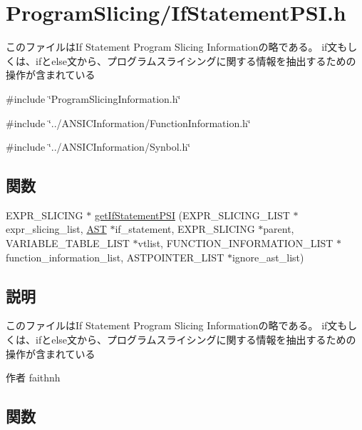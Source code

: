 \section{ProgramSlicing/IfStatementPSI.h}
\label{IfStatementPSI_8h}


このファイルはIf Statement Program Slicing Informationの略である。 if文もしくは、ifとelse文から、プログラムスライシングに関する情報を抽出するための操作が含まれている  


{\ttfamily \#include \char`\"{}ProgramSlicingInformation.h\char`\"{}}\par
{\ttfamily \#include \char`\"{}../ANSICInformation/FunctionInformation.h\char`\"{}}\par
{\ttfamily \#include \char`\"{}../ANSICInformation/Synbol.h\char`\"{}}\par
\subsection*{関数}
\begin{DoxyCompactItemize}
\item 
EXPR\_\-SLICING $\ast$ \hyperlink{IfStatementPSI_8h_a4044e731b04632e5f98eed34d6afb041}{getIfStatementPSI} (EXPR\_\-SLICING\_\-LIST $\ast$expr\_\-slicing\_\-list, \hyperlink{structabstract__syntax__tree}{AST} $\ast$if\_\-statement, EXPR\_\-SLICING $\ast$parent, VARIABLE\_\-TABLE\_\-LIST $\ast$vtlist, FUNCTION\_\-INFORMATION\_\-LIST $\ast$function\_\-information\_\-list, ASTPOINTER\_\-LIST $\ast$ignore\_\-ast\_\-list)
\end{DoxyCompactItemize}


\subsection{説明}
このファイルはIf Statement Program Slicing Informationの略である。 if文もしくは、ifとelse文から、プログラムスライシングに関する情報を抽出するための操作が含まれている \begin{DoxyAuthor}{作者}
faithnh 
\end{DoxyAuthor}


\subsection{関数}
